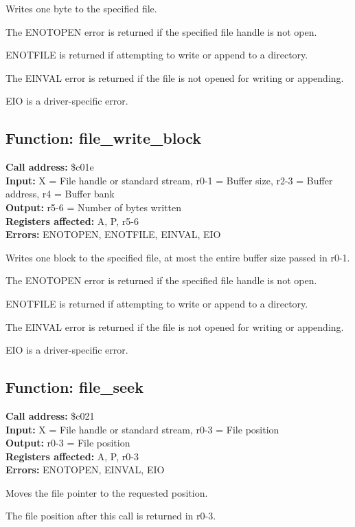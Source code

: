 Writes one byte to the specified file.

The ENOTOPEN error is returned if the specified file handle is not open.

ENOTFILE is returned if attempting to write or append
to a directory.

The EINVAL error is returned if the file is not opened for writing or appending.

EIO is a driver-specific error.


\subsection{Function: file\_write\_block}

\textbf{Call address:} \$c01e\\
\textbf{Input:} X = File handle or standard stream, r0-1 = Buffer size, r2-3 = Buffer address, r4 = Buffer bank \\
\textbf{Output:} r5-6 = Number of bytes written \\
\textbf{Registers affected:} A, P, r5-6 \\
\textbf{Errors:} ENOTOPEN, ENOTFILE, EINVAL, EIO

Writes one block to the specified file, at most the entire buffer size passed in r0-1.

The ENOTOPEN error is returned if the specified file handle is not open.

ENOTFILE is returned if attempting to write or append
to a directory.

The EINVAL error is returned if the file is not opened for writing or appending.

EIO is a driver-specific error.


\subsection{Function: file\_seek}

\textbf{Call address:} \$c021\\
\textbf{Input:} X = File handle or standard stream, r0-3 = File position \\
\textbf{Output:} r0-3 = File position \\
\textbf{Registers affected:} A, P, r0-3 \\
\textbf{Errors:} ENOTOPEN, EINVAL, EIO

Moves the file pointer to the requested position.

The file position after this call is returned in r0-3.

